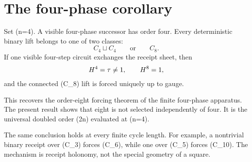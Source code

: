 \section{The four-phase corollary}

Set (n=4). A visible four-phase successor has order four. Every deterministic
binary lift belongs to one of two classes:
\[
C_4\sqcup C_4
\qquad\text{or}\qquad
C_8.
\]
If one visible four-step circuit exchanges the receipt sheet, then
\[
H^4=\tau\neq1,
\qquad
H^8=1,
\]
and the connected (C_8) lift is forced uniquely up to gauge.

This recovers the order-eight forcing theorem of the finite four-phase
apparatus. The present result shows that eight is not selected independently
of four. It is the universal doubled order (2n) evaluated at (n=4).

The same conclusion holds at every finite cycle length. For example, a
nontrivial binary receipt over (C_3) forces (C_6), while one over (C_5)
forces (C_{10}). The mechanism is receipt holonomy, not the special geometry
of a square.

